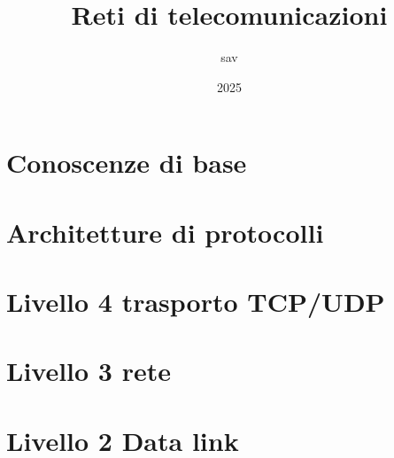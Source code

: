 \documentclass{report}
\title{Reti di telecomunicazioni}
\author{sav}
\date{2025}
\begin{document}
\maketitle
\tableofcontents


\chapter{Conoscenze di base}



\chapter{Architetture di protocolli}


\chapter{Livello 4 trasporto TCP/UDP}


\chapter{Livello 3 rete}


\chapter{Livello 2 Data link}


\newpage


\newpage




\end{document}
